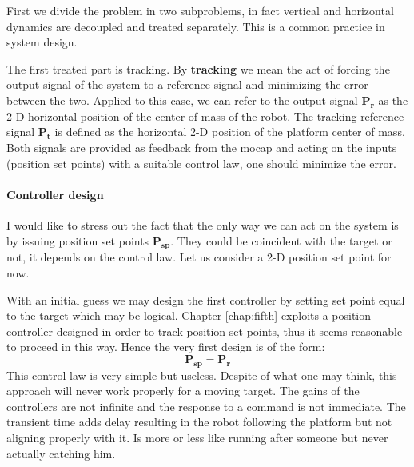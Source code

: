 First we divide the problem in two subproblems, in fact vertical and horizontal dynamics are decoupled and treated separately. This is a common practice in system design. 

The first treated part is tracking. By \textbf{tracking} we mean the act of forcing the output signal of the system to a reference signal and minimizing the error between the two. Applied to this case, we can refer to the output signal $\boldsymbol{P_r}$ as the 2-D horizontal position of the center of mass of the robot. The tracking reference signal 
$\boldsymbol{P_t}$ is defined as the horizontal 2-D position  of the platform center of mass. Both signals are provided as feedback from the mocap and acting on the inputs (position set points) with a suitable control law, one should minimize the error.

\paragraph{Controller design} I would like to stress out the fact that the only way we can act on the system is by issuing position set points $\boldsymbol{P_{sp}}$. They could be coincident with the target or not, it depends on the control law. Let us consider a 2-D position set point for now.

With an initial guess we may design the first controller by setting set point equal to the target which may be logical. Chapter \ref{chap:fifth} exploits a position controller designed in order to track position set points, thus it seems reasonable to proceed in this way. Hence the very first design is of the form:
\begin{equation}
\boldsymbol{P_{sp }} = \boldsymbol{P_{r}}
\label{eq:contr1}
\end{equation}
This control law is very simple but useless. Despite of what one may think, this approach will never work properly for a moving target. The gains of the controllers are not infinite and the response to a command is not immediate. The transient time adds delay resulting in the robot following the platform but not aligning properly with it. Is more or less like running after someone but never actually catching him.


